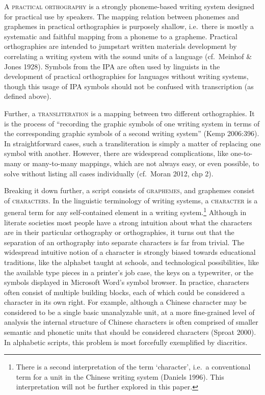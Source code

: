 A \textsc{practical orthography} is a strongly phoneme-based writing system designed for practical use by speakers. The mapping relation between phonemes and graphemes in practical orthographies is purposely shallow, i.e.~there is mostly a systematic and faithful mapping from a phoneme to a grapheme. Practical orthographies are intended to jumpstart written materials development by correlating a writing system with the sound units of a language (cf.~Meinhof \& Jones 1928). Symbols from the IPA are often used by linguists in the development of practical orthographies for languages without writing systems, though this usage of IPA symbols should not be confused with transcription (as defined above). 

Further, a \textsc{transliteration} is a mapping between two different orthographies. It is the process of ``recording the graphic symbols of one writing system in terms of the corresponding graphic symbols of a second writing system'' (Kemp 2006:396). In straightforward cases, such a transliteration is simply a matter of replacing one symbol with another. However, there are widespread complications, like one-to-many or many-to-many mappings, which are not always easy, or even possible, to solve without listing all cases individually (cf.~Moran 2012, chp 2).

Breaking it down further, a script consists of \textsc{graphemes}, and graphemes consist of \textsc{characters}. In the linguistic terminology of writing systems, a \textsc{character} is a general term for any self-contained element in a writing system.\footnote{There is a second interpretation of the term `character', i.e.~a conventional term for a unit in the Chinese writing system (Daniels 1996). This interpretation will not be further explored in this paper.} Although in literate societies most people have a strong intuition about what the characters are in their particular orthography or orthographies, it turns out that the separation of an orthography into separate characters is far from trivial. The widespread intuitive notion of a character is strongly biased towards educational traditions, like the alphabet taught at schools, and technological possibilities, like the available type pieces in a printer's job case, the keys on a typewriter, or the symbols displayed in Microsoft Word's symbol browser. In practice, characters often consist of multiple building blocks, each of which could be considered a character in its own right. For example, although a Chinese character may be considered to be a single basic unanalyzable unit, at a more fine-grained level of analysis the internal structure of Chinese characters is often comprised of smaller semantic and phonetic units that should be considered characters (Sproat 2000). In alphabetic scripts, this problem is most forcefully exemplified by diacritics. 

